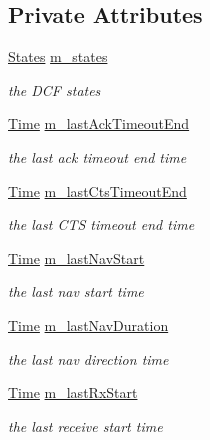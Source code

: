 \subsection*{Private Attributes}
\begin{DoxyCompactItemize}
\item 
\hyperlink{classns3_1_1DcfManager_a1ccfb8ce052dc22c3dedcbcb4b51e005}{States} \hyperlink{classns3_1_1DcfManager_a4999c9465af21e3ff6e0949f28f17466}{m\+\_\+states}
\begin{DoxyCompactList}\small\item\em the D\+CF states \end{DoxyCompactList}\item 
\hyperlink{classns3_1_1Time}{Time} \hyperlink{classns3_1_1DcfManager_a8a224e47f94cc69bc3dd0d88f2099a15}{m\+\_\+last\+Ack\+Timeout\+End}
\begin{DoxyCompactList}\small\item\em the last ack timeout end time \end{DoxyCompactList}\item 
\hyperlink{classns3_1_1Time}{Time} \hyperlink{classns3_1_1DcfManager_abeffda3976f92d50616835e3b8b34e32}{m\+\_\+last\+Cts\+Timeout\+End}
\begin{DoxyCompactList}\small\item\em the last C\+TS timeout end time \end{DoxyCompactList}\item 
\hyperlink{classns3_1_1Time}{Time} \hyperlink{classns3_1_1DcfManager_a9b355425c50b92120b02980aedd14c8b}{m\+\_\+last\+Nav\+Start}
\begin{DoxyCompactList}\small\item\em the last nav start time \end{DoxyCompactList}\item 
\hyperlink{classns3_1_1Time}{Time} \hyperlink{classns3_1_1DcfManager_ac1345fd3e89ee2e0acb0665082669af7}{m\+\_\+last\+Nav\+Duration}
\begin{DoxyCompactList}\small\item\em the last nav direction time \end{DoxyCompactList}\item 
\hyperlink{classns3_1_1Time}{Time} \hyperlink{classns3_1_1DcfManager_ab89f6e56efb993905d97ba7e28f6cc36}{m\+\_\+last\+Rx\+Start}
\begin{DoxyCompactList}\small\item\em the last receive start time \end{DoxyCompactList}\item 

\end{DoxyCompactItemize}
